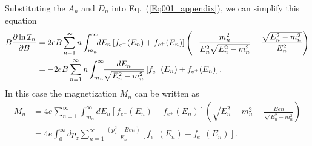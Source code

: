 \documentclass[sn-mathphys,Numbered]{sn-jnl}
\begin{document}
Substituting the $A_n$ and $D_n$ into Eq.~(\ref{Eq001_appendix}), we can simplify this equation 
\begin{align}
B\frac{\partial\ln\mathcal{I}_n}{\partial B}
&=2eB\sum_{n=1}^\infty n\int_{m_n}^\infty\!\!dE_n \left[f_{e^-}(E_n)+f_{e^+}(E_n)\right]\left(-\frac{m^2_n}{E^2_{n}\sqrt{E^2_n-m^2_n}}-\frac{\sqrt{E^2_n-m^2_n}}{E^2_{n}}\right)\notag\\
&=-2eB\sum_{n=1}^\infty n\int_{m_n}^\infty\!\!\frac{dE_n}{\sqrt{E^2_n-m^2_n}} \left[f_{e^-}(E_n)+f_{e^+}(E_n)\right].
\end{align}
In this case the magnetization $M_n$ can be written as
\begin{align}
M_n&=4e\sum_{n=1}^\infty \int_{m_n}^\infty\!\!dE_n\left[f_{e^-}(E_n)+f_{e^+}(E_n)\right]\left({\sqrt{E^2_n-m^2_n}}-\frac{Ben}{\sqrt{E^2_n-m^2_n}}\right)\\
&=4e \int_{0}^\infty\!\!dp_z\sum_{n=1}^\infty\frac{(p_z^2-Ben)}{E_n}\left[f_{e^-}(E_n)+f_{e^+}(E_n)\right].
\end{align}
\end{document}
